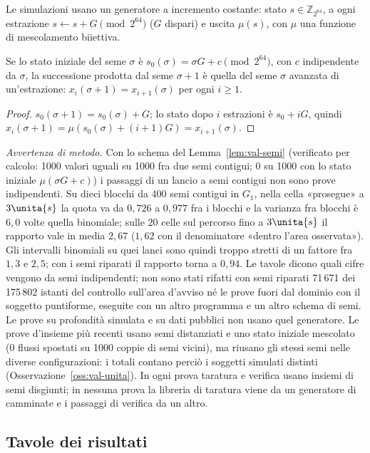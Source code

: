 Le simulazioni usano un generatore a incremento costante: stato $s\in\mathbb Z_{2^{64}}$, a ogni estrazione $s\leftarrow s+G\pmod{2^{64}}$ ($G$ dispari) e uscita $\mu(s)$, con $\mu$ una funzione di mescolamento biiettiva.

\begin{lemma}\label{lem:val-semi}
Se lo stato iniziale del seme $\sigma$ è $s_0(\sigma)=\sigma G+c\pmod{2^{64}}$, con $c$ indipendente da $\sigma$, la successione prodotta dal seme $\sigma+1$ è quella del seme $\sigma$ avanzata di un'estrazione: $x_i(\sigma+1)=x_{i+1}(\sigma)$ per ogni $i\ge1$. 
\end{lemma}
\begin{proof}
$s_0(\sigma+1)=s_0(\sigma)+G$; lo stato dopo $i$ estrazioni è $s_0+iG$, quindi $x_i(\sigma+1)=\mu(s_0(\sigma)+(i+1)G)=x_{i+1}(\sigma)$.
\end{proof}
\emph{Avvertenza di metodo.} Con lo schema del Lemma~\ref{lem:val-semi} (verificato per calcolo: 1000 valori uguali su 1000 fra due semi contigui; 0 su 1000 con lo stato iniziale $\mu(\sigma G+c)$) i passaggi di un lancio a semi contigui non sono prove indipendenti. Su dieci blocchi da 400 semi contigui in $G_1$, nella cella «prosegue» a $3\unita{s}$ la quota va da $0{,}726$ a $0{,}977$ fra i blocchi e la varianza fra blocchi è $6{,}0$ volte quella binomiale; sulle 20 celle sul percorso fino a $3\unita{s}$ il rapporto vale in media $2{,}67$ ($1{,}62$ con il denominatore «dentro l'area osservata»). Gli intervalli binomiali su quei lanci sono quindi troppo stretti di un fattore fra $1{,}3$ e $2{,}5$; con i semi riparati il rapporto torna a $0{,}94$. Le tavole dicono quali cifre vengono da semi indipendenti; non sono stati rifatti con semi riparati 71\,671 dei 175\,802 istanti del controllo sull'area d'avviso né le prove fuori dal dominio con il soggetto puntiforme, eseguite con un altro programma e un altro schema di semi. Le prove su profondità simulata e su dati pubblici non usano quel generatore. Le prove d'insieme più recenti usano semi distanziati e uno stato iniziale mescolato (0 flussi spostati su 1000 coppie di semi vicini), ma riusano gli stessi semi nelle diverse configurazioni: i totali contano perciò i soggetti simulati distinti (Osservazione~\ref{oss:val-unita}). In ogni prova taratura e verifica usano insiemi di semi disgiunti; in nessuna prova la libreria di taratura viene da un generatore di camminate e i passaggi di verifica da un altro.

\subsection{Tavole dei risultati}\label{sec:val-tavole}

